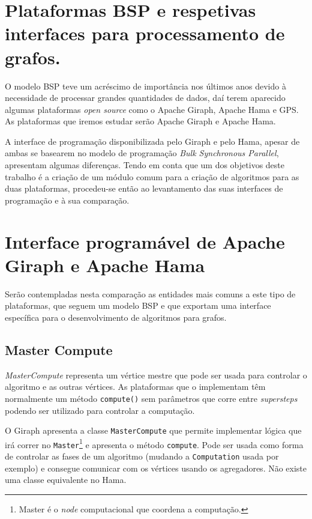 \section{Plataformas BSP e respetivas interfaces para processamento de grafos.}

O modelo BSP teve um acréscimo de importância nos últimos anos devido à 
necessidade de processar grandes quantidades de dados, daí terem aparecido 
algumas plataformas \textit{open source} como o Apache Giraph, Apache Hama e 
GPS. As plataformas que iremos estudar serão Apache Giraph e 
Apache Hama.

A interface de programação disponibilizada pelo Giraph e pelo Hama, apesar de 
ambas se basearem no modelo de programação \textit{Bulk Synchronous Parallel}, 
apresentam algumas diferenças. Tendo em conta que um dos objetivos deste 
trabalho é a criação de um módulo comum para a criação de algoritmos para as 
duas plataformas, procedeu-se então ao levantamento das suas interfaces de 
programação e à sua comparação. 

\section{Interface programável de Apache Giraph e Apache Hama}
Serão contempladas nesta comparação as entidades mais comuns a este tipo de 
plataformas, que seguem um modelo BSP e que exportam uma interface específica 
para o desenvolvimento de algoritmos para grafos. 

\subsection{Master Compute}
\textit{MasterCompute} representa um vértice mestre que pode ser usada para controlar o algoritmo e as outras vértices. As plataformas que o implementam têm normalmente um método \texttt{compute()} sem parâmetros que corre entre \textit{supersteps} podendo ser utilizado para controlar a computação.


O Giraph apresenta a classe \texttt{MasterCompute} que permite implementar lógica que irá correr no \texttt{Master}\footnote{Master é o \textit{node} computacional que coordena a computação.} e apresenta o método \texttt{compute}. Pode ser usada como forma de controlar as fases de um algoritmo (mudando a \texttt{Computation} usada por exemplo) e consegue comunicar com os vértices usando os agregadores. Não existe uma classe equivalente no Hama.











%
